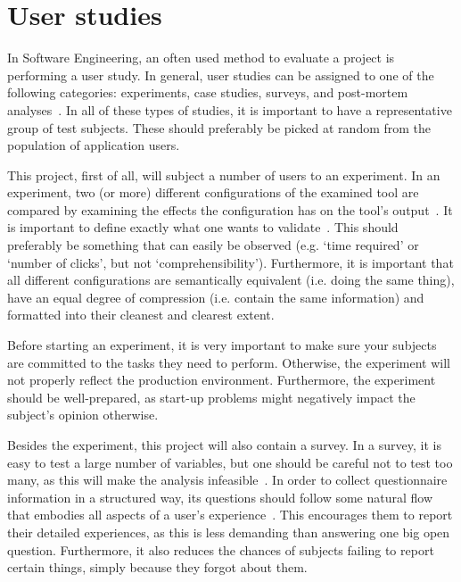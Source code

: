 \section{User studies}

In Software Engineering, an often used method to evaluate a project is performing a user study. In general, user studies can be assigned to one of the following categories: experiments, case studies, surveys, and post-mortem analyses~\cite{wohlin2003empirical}. In all of these types of studies, it is important to have a representative group of test subjects. These should preferably be picked at random from the population of application users.

This project, first of all, will subject a number of users to an experiment. In an experiment, two (or more) different configurations of the examined tool are compared by examining the effects the configuration has on the tool's output~\cite{wohlin2003empirical}. It is important to define exactly what one wants to validate~\cite{stein2009assessing}. This should preferably be something that can easily be observed (e.g. `time required' or `number of clicks', but not `comprehensibility'). Furthermore, it is important that all different configurations are semantically equivalent (i.e. doing the same thing), have an equal degree of compression (i.e. contain the same information) and formatted into their cleanest and clearest extent.

Before starting an experiment, it is very important to make sure your subjects are committed to the tasks they need to perform. Otherwise, the experiment will not properly reflect the production environment. Furthermore, the experiment should be well-prepared, as start-up problems might negatively impact the subject's opinion otherwise.

Besides the experiment, this project will also contain a survey. In a survey, it is easy to test a large number of variables, but one should be careful not to test too many, as this will make the analysis infeasible~\cite{wohlin2003empirical}. In order to collect questionnaire information in a structured way, its questions should follow some natural flow that embodies all aspects of a user's experience~\cite{tuch2013analyzing}. This encourages them to report their detailed experiences, as this is less demanding than answering one big open question. Furthermore, it also reduces the chances of subjects failing to report certain things, simply because they forgot about them.

